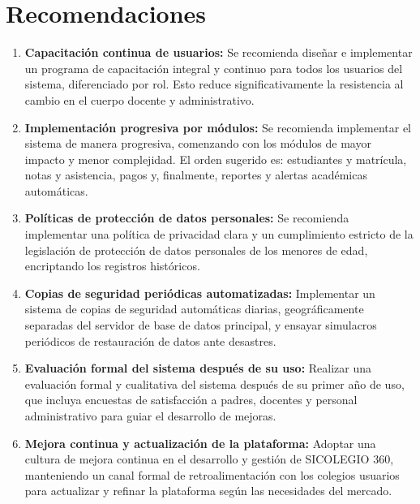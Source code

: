 \documentclass[12pt,a4paper,oneside]{report}
\begin{document}
\section{Recomendaciones}

\begin{enumerate}
    \item \textbf{Capacitación continua de usuarios:} Se recomienda diseñar e implementar un programa de capacitación integral y continuo para todos los usuarios del sistema, diferenciado por rol. Esto reduce significativamente la resistencia al cambio en el cuerpo docente y administrativo.
    \item \textbf{Implementación progresiva por módulos:} Se recomienda implementar el sistema de manera progresiva, comenzando con los módulos de mayor impacto y menor complejidad. El orden sugerido es: estudiantes y matrícula, notas y asistencia, pagos y, finalmente, reportes y alertas académicas automáticas.
    \item \textbf{Políticas de protección de datos personales:} Se recomienda implementar una política de privacidad clara y un cumplimiento estricto de la legislación de protección de datos personales de los menores de edad, encriptando los registros históricos.
    \item \textbf{Copias de seguridad periódicas automatizadas:} Implementar un sistema de copias de seguridad automáticas diarias, geográficamente separadas del servidor de base de datos principal, y ensayar simulacros periódicos de restauración de datos ante desastres.
    \item \textbf{Evaluación formal del sistema después de su uso:} Realizar una evaluación formal y cualitativa del sistema después de su primer año de uso, que incluya encuestas de satisfacción a padres, docentes y personal administrativo para guiar el desarrollo de mejoras.
    \item \textbf{Mejora continua y actualización de la plataforma:} Adoptar una cultura de mejora continua en el desarrollo y gestión de SICOLEGIO 360, manteniendo un canal formal de retroalimentación con los colegios usuarios para actualizar y refinar la plataforma según las necesidades del mercado.
\end{enumerate}
\end{document}
